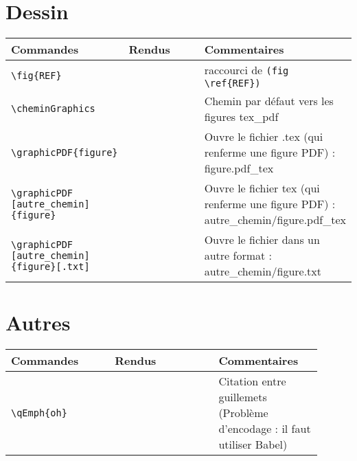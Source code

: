 \documentclass[a4paper,12pt]{article}
\begin{document}
	
	\section{Dessin\label{REF}}

        \noindent
		\begin{tabular}{|p{0.3\linewidth}|p{0.3\linewidth}|p{0.4\linewidth}|}
			\hline
				\textbf{Commandes}&\textbf{Rendus}&\textbf{Commentaires}
			\\\hline\hline
				\verb!\fig{REF}!	&\fig{REF} 	&	raccourci de \verb!(fig \ref{REF})!
			\\\hline
				\verb!\cheminGraphics!	& \cheminGraphics	&	Chemin par défaut vers les figures tex\_pdf
			\\\hline
				\verb!\graphicPDF{figure}!	& 	&	Ouvre le fichier .tex (qui renferme une figure PDF) : \cheminGraphics figure.pdf\_tex
			\\\hline
				\verb!\graphicPDF! \verb![autre_chemin]! \verb!{figure}!	& 	&	Ouvre le fichier tex (qui renferme une figure PDF) : autre\_chemin/figure.pdf\_tex
			\\\hline
				\verb!\graphicPDF! \verb![autre_chemin]! \verb!{figure}[.txt]!	& 	&	Ouvre le fichier dans un autre format : autre\_chemin/figure.txt
			\\\hline
		\end{tabular}
	

	\section{Autres}

		\noindent
		\begin{tabular}{|p{0.3\linewidth}|p{0.3\linewidth}|p{0.3\linewidth}|}
			\hline
				\textbf{Commandes}&\textbf{Rendus}&\textbf{Commentaires}
			\\\hline\hline
				\verb!\qEmph{oh}!	&	\qEmph{oh} 	&	Citation entre guillemets (Problème d'encodage : il faut utiliser Babel)
			\\\hline
		\end{tabular}
\end{document}
